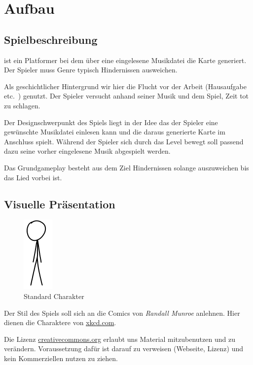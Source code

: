 \documentclass[Skript.tex]{subfiles}
\begin{document}
\section{Aufbau}

\subsection{Spielbeschreibung}

\gname ist ein Platformer bei dem über eine eingelesene Musikdatei die Karte generiert.
Der Spieler muss Genre typisch Hindernissen ausweichen.

Als geschichtlicher Hintergrund wir hier die Flucht vor der Arbeit (Hausaufgabe etc.\ ) genutzt. 
Der Spieler versucht anhand seiner Musik und dem Spiel, Zeit tot zu schlagen.

Der Designschwerpunkt des Spiels \gname liegt in der Idee das der Spieler eine gewünschte Musikdatei einlesen kann und die daraus generierte Karte im Anschluss spielt. 
Während der Spieler sich durch das Level bewegt soll passend dazu seine vorher eingelesene Musik abgespielt werden.

Das Grundgameplay besteht aus dem Ziel Hindernissen solange auszuweichen bis das Lied vorbei ist. 

\subsection{Visuelle Präsentation}
\begin{figure}
\vspace{-1.2cm}
  \begin{center}
    \includegraphics[scale=.9]{sketch/char.png}
	\caption{Standard Charakter}
	\label{charakter}
  \end{center}
\end{figure}

Der Stil des Spiels \gname soll sich an die Comics von \textit{Randall Munroe} anlehnen.
Hier dienen die Charaktere von \href{http://xkcd.com}{xkcd.com}.




Die Lizenz \href{http://creativecommons.org/licenses/by-nc/2.5/}{creativecommons.org} erlaubt uns Material mitzubenutzen und  zu verändern.
Voraussetzung dafür ist darauf zu verweisen (Webseite, Lizenz) und kein Kommerziellen nutzen zu ziehen.
\end{document}

